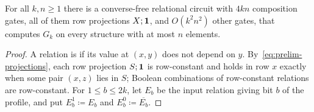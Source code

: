 \begin{proposition}\label{prop:small-domains}
For all $k,n\ge1$ there is a converse-free relational circuit with $4kn$
composition gates, all of them row projections $X;\mathbf{1}$, and $O(k^2n^2)$
other gates, that computes $G_k$ on every structure with at most $n$
elements.
\end{proposition}
\begin{proof}
A relation is  if its value at $(x,y)$ does not
depend on $y$. By~\eqref{eq:prelim-projections}, each row projection $S;\mathbf{1}$
is row-constant and holds in row $x$ exactly when some pair
$(x,z)$ lies in $S$; Boolean
combinations of row-constant relations are row-constant. For
$1\le b\le2k$, let $E_b$ be the input relation giving bit $b$ of the
profile, and put $E_b^1\coloneqq E_b$ and $E_b^0\coloneqq\overline{E_b}$.


\end{proof}
